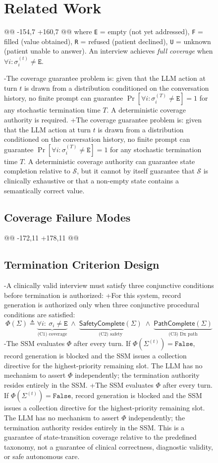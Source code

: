 \begin{figure}[t]
{ %
 \section{Related Work}
@@ -154,7 +160,7 @@
 \]
 where \texttt{E} = empty (not yet addressed), \texttt{F} = filled (value obtained), \texttt{R} = refused (patient declined), \texttt{U} = unknown (patient unable to answer). An interview achieves \textit{full coverage} when $\forall i: \sigma_i^{(t)} \neq \texttt{E}$.
 
-The coverage guarantee problem is: given that the LLM action at turn $t$ is drawn from a distribution conditioned on the conversation history, no finite prompt can guarantee $\Pr[\forall i: \sigma_i^{(T)} \neq \texttt{E}] = 1$ for any stochastic termination time $T$. A deterministic coverage authority is required.
+The coverage guarantee problem is: given that the LLM action at turn $t$ is drawn from a distribution conditioned on the conversation history, no finite prompt can guarantee $\Pr[\forall i: \sigma_i^{(T)} \neq \texttt{E}] = 1$ for any stochastic termination time $T$. A deterministic coverage authority can guarantee state completion relative to $\mathcal{S}$, but it cannot by itself guarantee that $\mathcal{S}$ is clinically exhaustive or that a non-empty state contains a semantically correct value.
 
 \subsection{Coverage Failure Modes}
 
@@ -172,11 +178,11 @@
 
 \subsection{Termination Criterion Design}
 
-A clinically valid interview must satisfy three conjunctive conditions before termination is authorized:
+For this system, record generation is authorized only when three conjunctive procedural conditions are satisfied:
 {\small\[
 \Phi(\Sigma) \triangleq \underbrace{\forall i:\ \sigma_i \neq \texttt{E}}_{\text{(C1) coverage}} \;\wedge\; \underbrace{\mathsf{SafetyComplete}(\Sigma)}_{\text{(C2) safety}} \;\wedge\; \underbrace{\mathsf{PathComplete}(\Sigma)}_{\text{(C3) Dx path}}
 \]}
-The SSM evaluates $\Phi$ after every turn. If $\Phi(\Sigma^{(t)}) = \texttt{False}$, record generation is blocked and the SSM issues a collection directive for the highest-priority remaining slot. The LLM has no mechanism to assert $\Phi$ independently; the termination authority resides entirely in the SSM.
+The SSM evaluates $\Phi$ after every turn. If $\Phi(\Sigma^{(t)}) = \texttt{False}$, record generation is blocked and the SSM issues a collection directive for the highest-priority remaining slot. The LLM has no mechanism to assert $\Phi$ independently; the termination authority resides entirely in the SSM. This is a guarantee of state-transition coverage relative to the predefined taxonomy, not a guarantee of clinical correctness, diagnostic validity, or safe autonomous care.
 
}
\end{figure}
